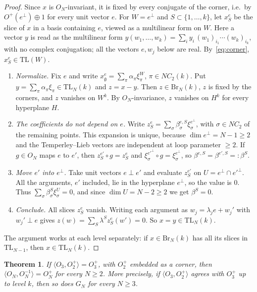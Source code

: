 \documentclass[11pt]{amsart}
\newtheorem{theorem}{Theorem}[section]
\theoremstyle{definition}
\theoremstyle{remark}
\theoremstyle{plain}
\numberwithin{equation}{section}
\numberwithin{table}{section}
\newcommand{\TL}{\mathrm{TL}}
\newcommand{\Br}{\mathrm{Br}}
\begin{document}
\begin{proof}
Since $x$ is $O_N$-invariant, it is fixed by every conjugate of the corner, i.e.\ by $O^+(e^\perp)\oplus1$ for every unit
vector $e$. For $W=e^\perp$ and $S\subset\{1,\dots,k\}$, let $x^e_S$ be the slice of $x$ in a basis
containing $e$, viewed as a multilinear form on $W$. Here a vector $y$ is read as the multilinear form
$y(w_1,\dots,w_k)=\sum_iy_i\,(w_1)_{i_1}\cdots(w_k)_{i_k}$, with no complex conjugation; all the vectors $e,w_j$ below are real. By~\eqref{eq:corner}, $x^e_S\in\TL(W)$.
\begin{enumerate}
\item \emph{Normalize.} Fix $e$ and write $x^e_\emptyset=\sum_\pi\alpha_\pi\xi^W_\pi$, $\pi\in NC_2(k)$. Put
$y=\sum_\pi\alpha_\pi\xi_\pi\in\TL_N(k)$ and $z=x-y$. Then $z\in\Br_N(k)$, $z$ is fixed by the corners, and $z$ vanishes on
$W^k$. By $O_N$-invariance, $z$ vanishes on $H^k$ for every hyperplane $H$.
\item \emph{The coefficients do not depend on $e$.} Write $z^e_S=\sum_\sigma\beta^{e,S}_\sigma\xi^{e^\perp}_\sigma$, with
$\sigma\in NC_2$ of the remaining points. This expansion is unique, because $\dim e^\perp=N-1\ge2$ and the Temperley--Lieb
vectors are independent at loop parameter $\ge2$. If $g\in O_N$ maps $e$ to $e'$, then $z^{e'}_S\circ g=z^e_S$ and
$\xi^{e'^\perp}_\sigma\circ g=\xi^{e^\perp}_\sigma$, so $\beta^{e,S}=\beta^{e',S}=:\beta^S$.
\item \emph{Move $e'$ into $e^\perp$.} Take unit vectors $e\perp e'$ and evaluate $z^{e'}_S$ on $U=e^\perp\cap e'^\perp$. All
the arguments, $e'$ included, lie in the hyperplane $e^\perp$, so the value is $0$. Thus
$\sum_\sigma\beta^S_\sigma\xi^U_\sigma=0$, and since $\dim U=N-2\ge2$ we get $\beta^S=0$.
\item \emph{Conclude.} All slices $z^e_S$ vanish. Writing each argument as $w_j=\lambda_je+w_j'$ with $w_j'\perp e$ gives
$z(w)=\sum_S\lambda^Sz^e_S(w')=0$. So $x=y\in\TL_N(k)$.
\end{enumerate}
The argument works at each level separately: if $x\in\Br_N(k)$ has all its slices in $\TL_{N-1}$, then $x\in\TL_N(k)$.
\end{proof}

\begin{theorem}\label{thm:reduction}
If $\langle O_3,O_2^+\rangle=O_3^+$, with $O_2^+$ embedded as a corner, then $\langle O_N,O_N^{-1}\rangle=O_N^+$ for every
$N\ge2$. More precisely, if $\langle O_3,O_2^+\rangle$ agrees with $O_3^+$ up to level $k$, then so does $G_N$ for every $N\ge3$.
\end{theorem}
\end{document}

